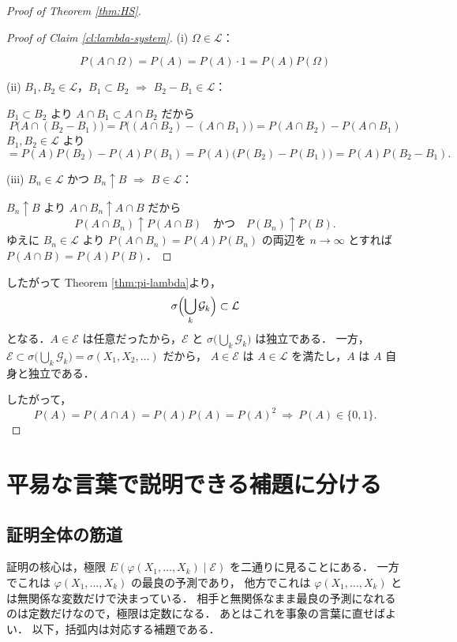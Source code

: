 \documentclass[a4paper,11pt,uplatex,dvipdfmx]{jsarticle}
\theoremstyle{plain}
\theoremstyle{definition}
\begin{document}
\begin{proof}[Proof of Theorem \ref{thm:HS}]
\begin{proof}[Proof of Claim \ref{cl:lambda-system}]
(i) $\Omega\in\mathcal{L}$：

\[P(A\cap\Omega)=P(A)=P(A)\cdot1=P(A)P(\Omega)\]

(ii) $B_1,B_2\in\mathcal{L}$，$B_1\subset B_2$ $\Rightarrow$ $B_2-B_1\in\mathcal{L}$：

$B_1\subset B_2$ より $A\cap B_1\subset A\cap B_2$ だから
\[
  P\bigl(A\cap(B_2-B_1)\bigr)=P\bigl((A\cap B_2)-(A\cap B_1)\bigr)
  =P(A\cap B_2)-P(A\cap B_1)
\]
$B_1,B_2\in\mathcal{L}$ より
\[
  =P(A)P(B_2)-P(A)P(B_1)=P(A)\bigl(P(B_2)-P(B_1)\bigr)=P(A)P(B_2-B_1).
\]

(iii) $B_n\in\mathcal{L}$ かつ $B_n\uparrow B$ $\Rightarrow$ $B\in\mathcal{L}$：

$B_n\uparrow B$ より $A\cap B_n\uparrow A\cap B$ だから
\[
  P(A\cap B_n)\uparrow P(A\cap B)\quad\text{かつ}\quad P(B_n)\uparrow P(B).
\]
ゆえに $B_n\in\mathcal{L}$ より $P(A\cap B_n)=P(A)P(B_n)$ の両辺を $n\to\infty$ とすれば
$P(A\cap B)=P(A)P(B)$．
\end{proof}

したがって Theorem \ref{thm:pi-lambda}より，
\[
  \sigma\Bigl(\bigcup_k\mathcal{G}_k\Bigr)\subset\mathcal{L}
\]
となる．$A\in\mathcal{E}$ は任意だったから，$\mathcal{E}$ と $\sigma\bigl(\bigcup_k\mathcal{G}_k\bigr)$ は独立である．
一方，$\mathcal{E}\subset\sigma\bigl(\bigcup_k\mathcal{G}_k\bigr)=\sigma(X_1,X_2,\dots)$ だから，
$A\in\mathcal{E}$ は $A\in\mathcal{L}$ を満たし，$A$ は $A$ 自身と独立である．
 
したがって，
\[
  P(A)=P(A\cap A)=P(A)P(A)=P(A)^2\ \Longrightarrow\ P(A)\in\{0,1\}.
\]
\end{proof}

\section{平易な言葉で説明できる補題に分ける}\label{sec:split}

\subsection{証明全体の筋道}

証明の核心は，極限 $E(\varphi(X_1,\dots,X_k)\mid\mathcal{E})$ を二通りに見ることにある．
一方でこれは $\varphi(X_1,\dots,X_k)$ の最良の予測であり，
他方でこれは $\varphi(X_1,\dots,X_k)$ とは無関係な変数だけで決まっている．
相手と無関係なまま最良の予測になれるのは定数だけなので，極限は定数になる．
あとはこれを事象の言葉に直せばよい．
以下，括弧内は対応する補題である．
\end{document}
